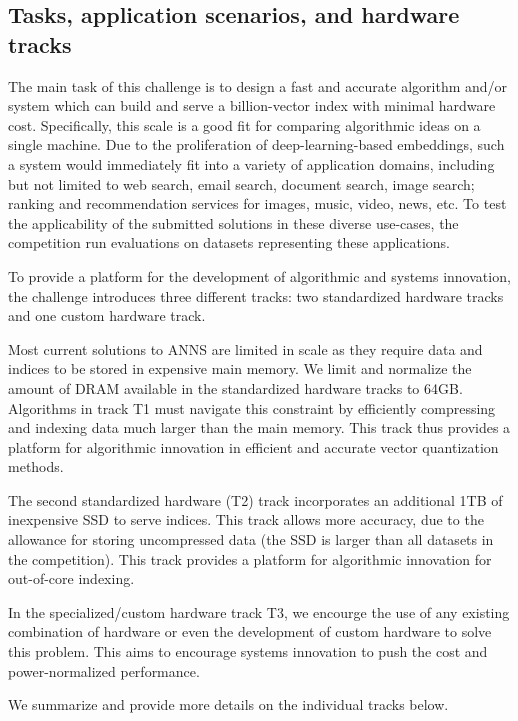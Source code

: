 \subsection{Tasks, application scenarios, and hardware tracks}

The main task of this challenge is to design a fast and accurate
algorithm and/or system which can build and serve a billion-vector
index with minimal hardware cost.  Specifically, this scale is a good fit
for comparing algorithmic ideas on a single machine.  Due to the
proliferation of deep-learning-based embeddings, such a system would
immediately fit into a variety of application domains, including but
not limited to web search, email search, document search, image
search; ranking and recommendation services for images, music, video,
news, etc.  To test the applicability of the submitted solutions in
these diverse use-cases, the competition run evaluations on
datasets representing these applications.


To provide a platform for the development of algorithmic and systems innovation,
the challenge introduces three different tracks: two standardized hardware tracks and 
one custom hardware track.

Most current solutions to ANNS are limited in scale as they require data
and indices to be stored in expensive main memory. We limit and
normalize the amount of DRAM available in the standardized hardware tracks
to 64GB.  Algorithms in track T1 must navigate this constraint by
efficiently compressing and indexing data much larger than the main
memory. This track thus provides a platform for algorithmic innovation 
in efficient and accurate vector quantization methods.

The second standardized hardware (T2) track incorporates 
an additional 1TB of inexpensive SSD to serve
indices. This track allows more accuracy, due to the allowance for
storing uncompressed data (the SSD is larger than all datasets in the
competition).  This track provides a platform for algorithmic
innovation for out-of-core indexing. 

In the specialized/custom hardware track T3, we encourge the use of any
existing combination of hardware or even the development of custom
hardware to solve this problem.  This aims to encourage systems
innovation to push the cost and power-normalized performance.

We summarize and provide more details on the individual tracks below.


